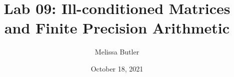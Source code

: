 \title{Lab 09: Ill-conditioned Matrices and Finite Precision Arithmetic}
\author{Melissa Butler}
\date{October 18, 2021}